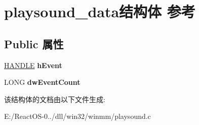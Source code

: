 \hypertarget{structplaysound__data}{}\section{playsound\+\_\+data结构体 参考}
\label{structplaysound__data}
\subsection*{Public 属性}
\begin{DoxyCompactItemize}
\item 
\mbox{\label{structplaysound__data_a28bde32b2dfa5c30b9f3bea144eb9e0f}} 
\hyperlink{interfacevoid}{H\+A\+N\+D\+LE} {\bfseries h\+Event}
\item 
\mbox{\label{structplaysound__data_a54f5fe85c6640d7778b3a834634f9b1f}} 
L\+O\+NG {\bfseries dw\+Event\+Count}
\end{DoxyCompactItemize}


该结构体的文档由以下文件生成\+:\begin{DoxyCompactItemize}
\item 
E\+:/\+React\+O\+S-\/0../dll/win32/winmm/playsound.\+c\end{DoxyCompactItemize}
